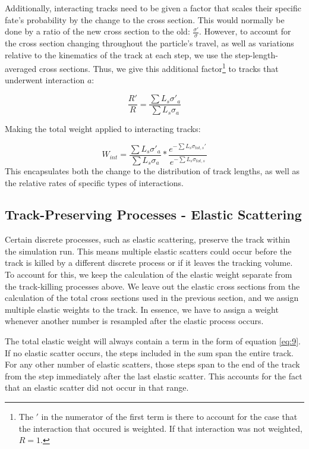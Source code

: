 \documentclass[12pt]{article}
\begin{document}
Additionally, interacting tracks need to be given a factor that scales their specific fate's probability by the change to the cross section. This would normally be done by a ratio of the new cross section to the old: $\frac{\sigma'}{\sigma}$. However, to account for the cross section changing throughout the particle's travel, as well as variations relative to the kinematics of the track at each step, we use the step-length-averaged cross sections. Thus, we give this additional factor\footnote{The $'$ in the numerator of the first term is there to account for the case that the interaction that occured is weighted. If that interaction was not weighted, $ R = 1$.} to tracks that underwent interaction $a$:

\begin{equation}
\frac{R'}{R} = \frac{\sum L_s \sigma'_a}{\sum L_s \sigma_a}
\end{equation}

Making the total weight applied to interacting tracks:

\begin{equation}\label{eq:int_weight_pop}
  W_{int} = \frac{\sum L_s \sigma'_a}{\sum L_s \sigma_a} * \frac{e^{-\sum L_s  \sigma_{tot,s}'}}{e^{-\sum L_s  \sigma_{tot,s}}}
\end{equation}
This encapsulates both the change to the distribution of track lengths, as well as the relative rates of specific types of interactions. 

\subsection{Track-Preserving Processes - Elastic Scattering}
Certain discrete processes, such as elastic scattering, preserve the track within the simulation run. This means multiple elastic scatters could occur before the track is killed by a different discrete process or if it leaves the tracking volume. To account for this, we keep the calculation of the elastic weight separate from the track-killing processes above. We leave out the elastic cross sections from the calculation of the total cross sections used in the previous section, and we assign multiple elastic weights to the track. In essence, we have to assign a weight whenever another number is resampled after the elastic process occurs. 

The total elastic weight will always contain a term in the form of equation \ref{eq:9}. If no elastic scatter occurs, the steps included in the sum span the entire track. For any other number of elastic scatters, those steps span to the end of the track from the step immediately after the last elastic scatter. This accounts for the fact that an elastic scatter did not occur in that range. 
\end{document}
